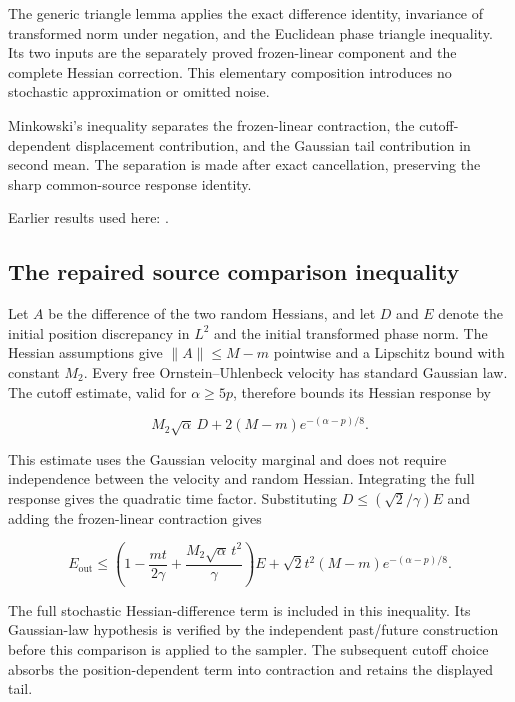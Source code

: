 \documentclass[11pt,a4paper]{report}
\begin{document}
The generic triangle lemma applies the exact difference identity, invariance of transformed norm under negation, and the Euclidean phase triangle inequality. Its two inputs are the separately proved frozen-linear component and the complete Hessian correction. This elementary composition introduces no stochastic approximation or omitted noise.



Minkowski’s inequality separates the frozen-linear contraction, the cutoff-dependent displacement contribution, and the Gaussian tail contribution in second mean. The separation is made after exact cancellation, preserving the sharp common-source response identity.



Earlier results used here: \cite[Section~3.8.17]{LangevinLean2026ULASC}.
\subsection{\texorpdfstring{The repaired source comparison inequality}{The repaired source comparison inequality}}
\label{report-step-KineticLangevin-SecondOrderComparison-lean-7}


Let \(A\) be the difference of the two random Hessians, and let \(D\) and \(E\) denote the initial position discrepancy in \(L^2\) and the initial transformed phase norm. The Hessian assumptions give \(\|A\|\le M-m\) pointwise and a Lipschitz bound with constant \(M_2\). Every free Ornstein–Uhlenbeck velocity has standard Gaussian law. The cutoff estimate, valid for \(\alpha\ge5p\), therefore bounds its Hessian response by

\[M_2\sqrt\alpha\,D+2(M-m)e^{-(\alpha-p)/8}.\]

This estimate uses the Gaussian velocity marginal and does not require independence between the velocity and random Hessian. Integrating the full response gives the quadratic time factor. Substituting \(D\le(\sqrt2/\gamma)E\) and adding the frozen-linear contraction gives

\[E_{\mathrm{out}}\le\left(1-\frac{mt}{2\gamma}+\frac{M_2\sqrt\alpha\,t^2}{\gamma}\right)E+\sqrt2t^2(M-m)e^{-(\alpha-p)/8}.\]

The full stochastic Hessian-difference term is included in this inequality. Its Gaussian-law hypothesis is verified by the independent past/\allowbreak{}future construction before this comparison is applied to the sampler. The subsequent cutoff choice absorbs the position-dependent term into contraction and retains the displayed tail.
\end{document}
